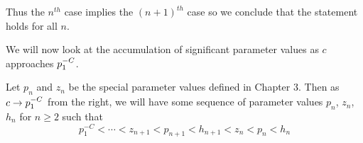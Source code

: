 \begin{myproof}
			Thus the $n^{th}$ case implies the $ (n+1)^{th}$ case so we conclude that the statement holds for all $n$.






		\end{myproof}




		We will now look at the accumulation of significant parameter values as $c$ approaches $p^{-C}_1$.

		\begin{mylemma}\label{vals2}
			Let  $p_n$ and $z_n$ be the special parameter values defined in Chapter 3. Then as $c \rightarrow p^{-C}_1$ from the right, we will have some sequence of parameter values $p_n$, $z_n$, $h_n$ for $n \geq 2$ such that
			\[
			p_1^{-C} < \cdots < z_{n+1} < p_{n+1} < h_{n+1} < z_n < p_n < h_n
			\]
		\end{mylemma}

